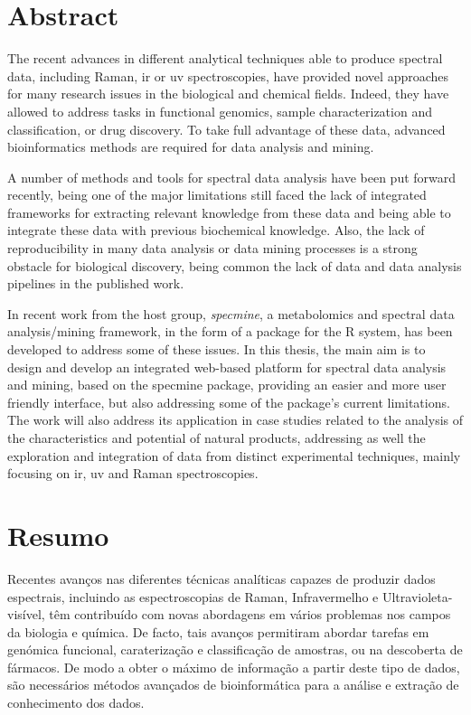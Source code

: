
\chapter*{Abstract}

The recent advances in different analytical techniques able to produce spectral data, including Raman, \gls{ir} or \gls{uv} spectroscopies, have provided novel approaches for many research issues in the biological and chemical fields. Indeed, they have allowed to address tasks in functional genomics, sample characterization and classification, or drug discovery. To take full advantage of these data, advanced bioinformatics methods are required for data analysis and mining. 

A number of methods and tools for spectral data analysis have been put forward recently, being one of the major limitations still faced the lack of integrated frameworks for extracting relevant knowledge from these data and being able to integrate these data with previous biochemical knowledge. Also, the lack of reproducibility in many data analysis or data mining processes is a strong obstacle for biological discovery, being common the lack of data and data analysis pipelines in the published work.

In recent work from the host group, \textit{specmine}, a metabolomics and spectral data analysis/mining framework, in the form of a package for the R system, has been developed to address some of these issues. In this thesis, the main aim is to design and develop an integrated web-based platform for spectral data analysis and mining, based on the specmine package, providing an easier and more user friendly interface, but also addressing some of the package's current limitations. The work will also address its application in case studies related to the analysis of the characteristics and potential of natural products, addressing as well the exploration and integration of data from distinct experimental techniques, mainly focusing on \gls{ir}, \gls{uv} and Raman spectroscopies.


\cleardoublepage

\chapter*{Resumo}

Recentes avanços nas diferentes técnicas analíticas capazes de produzir dados espectrais, incluindo as espectroscopias de Raman, Infravermelho e Ultravioleta-visível, têm contribuído com novas abordagens em vários problemas nos campos da biologia e química. De facto, tais avanços permitiram abordar tarefas em genómica funcional, caraterização e classificação de amostras, ou na descoberta de fármacos. De modo a obter o máximo de informação a partir deste tipo de dados, são necessários métodos avançados de bioinformática para a análise e extração de conhecimento dos dados.

